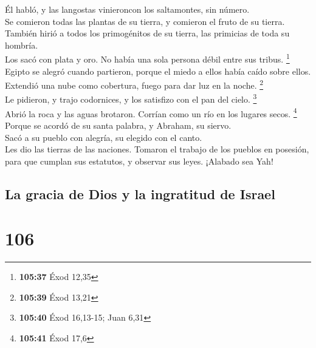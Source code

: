  Él habló, y las langostas vinieroncon los saltamontes,
sin número.\\
 Se comieron todas las plantas de su tierra, y comieron
el fruto de su tierra.\\
 También hirió a todos los primogénitos de su tierra, las
primicias de toda su hombría.\\
 Los sacó con plata y oro. No había una sola persona
débil entre sus tribus. \footnote{\textbf{105:37} Éxod 12,35}\\
 Egipto se alegró cuando partieron, porque el miedo a
ellos había caído sobre ellos.\\
 Extendió una nube como cobertura, fuego para dar luz en
la noche. \footnote{\textbf{105:39} Éxod 13,21}\\
 Le pidieron, y trajo codornices, y los satisfizo con el
pan del cielo. \footnote{\textbf{105:40} Éxod 16,13-15; Juan 6,31}\\
 Abrió la roca y las aguas brotaron. Corrían como un río
en los lugares secos. \footnote{\textbf{105:41} Éxod 17,6}\\
 Porque se acordó de su santa palabra, y Abraham, su
siervo.\\
 Sacó a su pueblo con alegría, su elegido con el canto.\\
 Les dio las tierras de las naciones. Tomaron el trabajo
de los pueblos en posesión,\\
 para que cumplan sus estatutos, y observar sus leyes.
¡Alabado sea Yah!

\hypertarget{la-gracia-de-dios-y-la-ingratitud-de-israel}{%
\subsection{La gracia de Dios y la ingratitud de
Israel}\label{la-gracia-de-dios-y-la-ingratitud-de-israel}}

\hypertarget{section-103}{%
\section{106}\label{section-103}}

